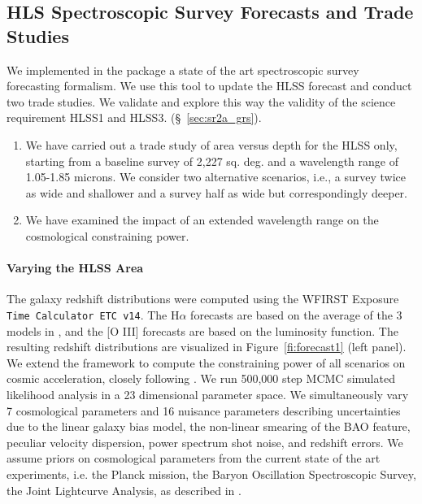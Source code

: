 \subsection{HLS Spectroscopic Survey Forecasts and Trade Studies}

\begin{summaryii}
  We implemented in the \CoLi package a state of the art spectroscopic survey forecasting formalism. We use this tool to update the HLSS forecast and conduct two trade studies. We validate and explore this way the validity of the science requirement HLSS1 and HLSS3. (\S~\ref{sec:sr2a_grs}).
  \begin{enumerate}
  \item We have carried out a trade study of area versus depth for the HLSS only, starting from a baseline survey of 2,227 sq. deg. and a wavelength range of 1.05-1.85 microns. We consider two alternative scenarios, i.e., a survey twice as wide and shallower and a survey half as wide but correspondingly deeper.
  \item We have examined the impact of an extended wavelength range on the cosmological constraining power.
\end{enumerate}
\end{summaryii}

\paragraph{Varying the HLSS Area} The galaxy redshift distributions were computed using the WFIRST Exposure
\texttt{Time Calculator ETC v14}. The H$\alpha$ forecasts are based on the
average of the 3 models in \citet{Pozzetti:2016}, and the [O III] forecasts are
based on the \citet{Mehta:2015} luminosity function. The resulting redshift
distributions are visualized in Figure~\ref{fi:forecast1} (left panel). We extend the \CoLi framework \citep{eks14,Krause2017} to compute the constraining power of all
scenarios on cosmic acceleration, closely following \citet{Wang2013}. We run
500,000 step MCMC simulated likelihood analysis in a 23 dimensional parameter
space. We simultaneously vary 7 cosmological parameters and 16 nuisance
parameters describing uncertainties due to the linear galaxy bias model, the
non-linear smearing of the BAO feature, peculiar velocity dispersion, power
spectrum shot noise, and redshift errors. We assume priors on cosmological
parameters from the current state of the art experiments, i.e. the Planck
mission, the Baryon Oscillation Spectroscopic Survey, the Joint Lightcurve
Analysis, as described in \citet{Aubourg:2015}.

